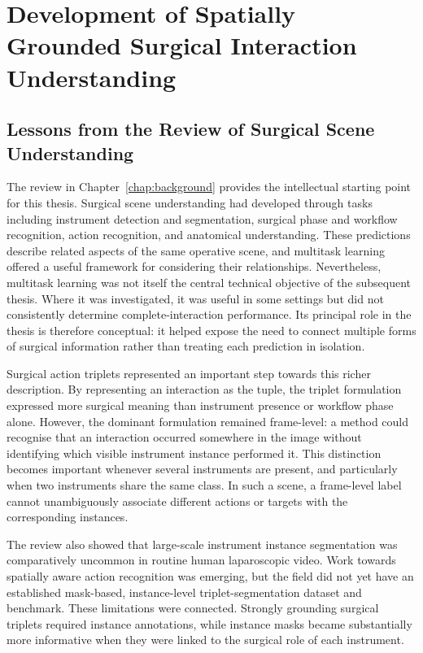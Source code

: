 \section[Spatially Grounded Surgical Interaction Understanding]{Development of Spatially Grounded Surgical Interaction Understanding}
\label{sec:discussion-development}

\subsection{Lessons from the Review of Surgical Scene Understanding}
\label{sec:discussion-review-lessons}

The review in Chapter~\ref{chap:background} provides the intellectual starting point for this thesis. Surgical scene understanding had developed through tasks including instrument detection and segmentation, surgical phase and workflow recognition, action recognition, and anatomical understanding. These predictions describe related aspects of the same operative scene, and multitask learning offered a useful framework for considering their relationships. Nevertheless, multitask learning was not itself the central technical objective of the subsequent thesis. Where it was investigated, it was useful in some settings but did not consistently determine complete-interaction performance. Its principal role in the thesis is therefore conceptual: it helped expose the need to connect multiple forms of surgical information rather than treating each prediction in isolation.

Surgical action triplets represented an important step towards this richer description. By representing an interaction as the \ivttriplet tuple, the triplet formulation expressed more surgical meaning than instrument presence or workflow phase alone. However, the dominant formulation remained frame-level: a method could recognise that an interaction occurred somewhere in the image without identifying which visible instrument instance performed it. This distinction becomes important whenever several instruments are present, and particularly when two instruments share the same class. In such a scene, a frame-level label cannot unambiguously associate different actions or targets with the corresponding instances.

The review also showed that large-scale instrument instance segmentation was comparatively uncommon in routine human laparoscopic video. Work towards spatially aware action recognition was emerging, but the field did not yet have an established mask-based, instance-level triplet-segmentation dataset and benchmark. These limitations were connected. Strongly grounding surgical triplets required instance annotations, while instance masks became substantially more informative when they were linked to the surgical role of each instrument.

